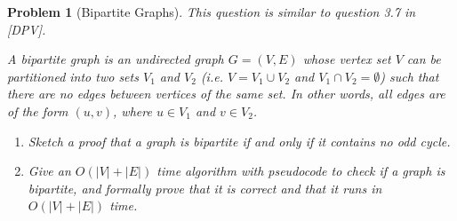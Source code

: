 \documentclass[10pt]{article}
\newtheorem{problem}{\sc\color{cit}Problem}
\begin{document}
\newpage




\begin{problem}[Bipartite Graphs]
This question is similar to question 3.7 in [DPV].

A bipartite graph is an undirected graph $G=(V,E)$ whose vertex set $V$ can be partitioned into two sets $V_1$ and $V_2$ (i.e. $V = V_1 \cup V_2$ and $V_1 \cap V_2 = \emptyset$) such that there are no edges between vertices of the same set. In other words, all edges are of the form $(u,v)$, where $u \in V_1$ and $v \in V_2$.

\begin{enumerate}
    \item[(a)]Sketch a proof that a graph is bipartite if and only if it contains no odd cycle.
    \item[(b)]Give an $O(|V|+|E|)$ time algorithm with pseudocode to check if a graph is bipartite, and formally prove that it is correct and that it runs in $O(|V|+|E|)$ time. 
\end{enumerate}
\end{problem}
\end{document}
